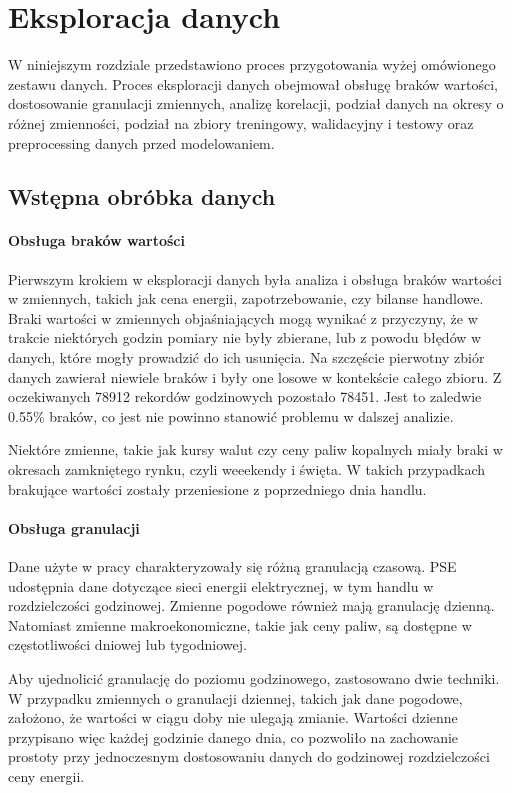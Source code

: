 \chapter{Eksploracja danych}
\label{sec:eksploracja}

W niniejszym rozdziale przedstawiono proces przygotowania wyżej omówionego zestawu danych. Proces eksploracji danych obejmował obsługę braków wartości, dostosowanie granulacji zmiennych, analizę korelacji, podział danych na okresy o różnej zmienności, podział na zbiory treningowy, walidacyjny i testowy oraz preprocessing danych przed modelowaniem.

\section{Wstępna obróbka danych}
\subsubsection{Obsługa braków wartości}
Pierwszym krokiem w eksploracji danych była analiza i obsługa braków wartości w zmiennych, takich jak cena energii, zapotrzebowanie, czy bilanse handlowe. Braki wartości w zmiennych objaśniających mogą wynikać z przyczyny, że w trakcie niektórych godzin pomiary nie były zbierane, lub z powodu błędów w danych, które mogły prowadzić do ich usunięcia. Na szczęście pierwotny zbiór danych zawierał niewiele braków i były one losowe w kontekście całego zbioru. Z oczekiwanych 78912 rekordów godzinowych pozostało 78451. Jest to zaledwie 0.55\% braków, co jest nie powinno stanowić problemu w dalszej analizie.

Niektóre zmienne, takie jak kursy walut czy ceny paliw kopalnych miały braki w okresach zamkniętego rynku, czyli weeekendy i święta. W takich przypadkach brakujące wartości zostały przeniesione z poprzedniego dnia handlu. 

\subsubsection{Obsługa granulacji}
Dane użyte w pracy charakteryzowały się różną granulacją czasową. PSE udostępnia dane dotyczące sieci energii elektrycznej, w tym handlu w rozdzielczości godzinowej. Zmienne pogodowe również mają granulację dzienną. Natomiast zmienne makroekonomiczne, takie jak ceny paliw, są dostępne w częstotliwości dniowej lub tygodniowej.

Aby ujednolicić granulację do poziomu godzinowego, zastosowano dwie techniki. W przypadku zmiennych o granulacji dziennej, takich jak dane pogodowe, założono, że wartości w ciągu doby nie ulegają zmianie. Wartości dzienne przypisano więc każdej godzinie danego dnia, co pozwoliło na zachowanie prostoty przy jednoczesnym dostosowaniu danych do godzinowej rozdzielczości ceny energii. 


